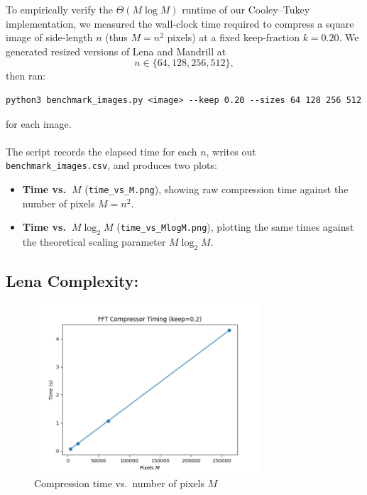 \documentclass[12pt]{article}
\begin{document}
To empirically verify the $\Theta(M\log M)$ runtime of our Cooley–Tukey implementation, we measured the wall‐clock time required to compress a square image of side‐length $n$ (thus $M=n^2$ pixels) at a fixed keep‐fraction $k=0.20$.  We generated resized versions of Lena and Mandrill at 
\[
n\in\{64,128,256,512\},
\]
\noindent then ran:
\begin{verbatim}
python3 benchmark_images.py <image> --keep 0.20 --sizes 64 128 256 512
\end{verbatim}
\noindent for each image.  
\\
\\
The script records the elapsed time for each $n$, writes out \texttt{benchmark\_images.csv}, and produces two plots:
\begin{itemize}
  \item \textbf{Time vs.\ $M$} (\texttt{time\_vs\_M.png}), showing raw compression time against the number of pixels $M=n^2$.
  \item \textbf{Time vs.\ $M\log_2M$} (\texttt{time\_vs\_MlogM.png}), plotting the same times against the theoretical scaling parameter $M\log_2M$.
\end{itemize}

\subsection{Lena Complexity:}

\begin{figure}[H]
  \centering
  \includegraphics[width=0.75\textwidth]{time_vs_M_Lena.png}
  \caption{Compression time vs.\ number of pixels $M$}
  \label{fig:time-vs-M}
\end{figure}
\end{document}
